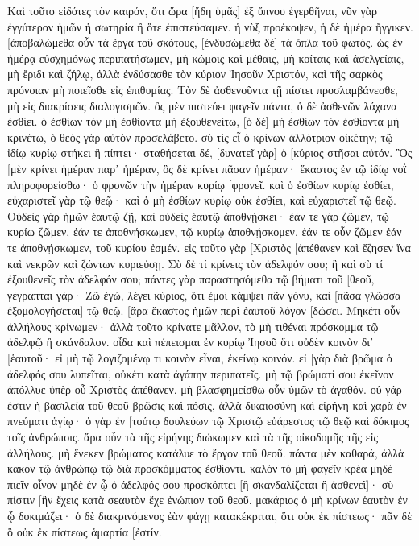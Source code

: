 Καὶ τοῦτο εἰδότες τὸν καιρόν, ὅτι ὥρα [ἤδη ὑμᾶς] ἐξ ὕπνου ἐγερθῆναι, νῦν γὰρ ἐγγύτερον ἡμῶν ἡ σωτηρία ἢ ὅτε ἐπιστεύσαμεν. 
ἡ νὺξ προέκοψεν, ἡ δὲ ἡμέρα ἤγγικεν. [ἀποβαλώμεθα οὖν τὰ ἔργα τοῦ σκότους, [ἐνδυσώμεθα δὲ] τὰ ὅπλα τοῦ φωτός. 
ὡς ἐν ἡμέρᾳ εὐσχημόνως περιπατήσωμεν, μὴ κώμοις καὶ μέθαις, μὴ κοίταις καὶ ἀσελγείαις, μὴ ἔριδι καὶ ζήλῳ, 
ἀλλὰ ἐνδύσασθε τὸν κύριον Ἰησοῦν Χριστόν, καὶ τῆς σαρκὸς πρόνοιαν μὴ ποιεῖσθε εἰς ἐπιθυμίας. 
Τὸν δὲ ἀσθενοῦντα τῇ πίστει προσλαμβάνεσθε, μὴ εἰς διακρίσεις διαλογισμῶν. 
ὃς μὲν πιστεύει φαγεῖν πάντα, ὁ δὲ ἀσθενῶν λάχανα ἐσθίει. 
ὁ ἐσθίων τὸν μὴ ἐσθίοντα μὴ ἐξουθενείτω, [ὁ δὲ] μὴ ἐσθίων τὸν ἐσθίοντα μὴ κρινέτω, ὁ θεὸς γὰρ αὐτὸν προσελάβετο. 
σὺ τίς εἶ ὁ κρίνων ἀλλότριον οἰκέτην; τῷ ἰδίῳ κυρίῳ στήκει ἢ πίπτει· σταθήσεται δέ, [δυνατεῖ γὰρ] ὁ [κύριος στῆσαι αὐτόν. 
Ὃς [μὲν κρίνει ἡμέραν παρ᾽ ἡμέραν, ὃς δὲ κρίνει πᾶσαν ἡμέραν· ἕκαστος ἐν τῷ ἰδίῳ νοῒ πληροφορείσθω· 
ὁ φρονῶν τὴν ἡμέραν κυρίῳ [φρονεῖ. καὶ ὁ ἐσθίων κυρίῳ ἐσθίει, εὐχαριστεῖ γὰρ τῷ θεῷ· καὶ ὁ μὴ ἐσθίων κυρίῳ οὐκ ἐσθίει, καὶ εὐχαριστεῖ τῷ θεῷ. 
Οὐδεὶς γὰρ ἡμῶν ἑαυτῷ ζῇ, καὶ οὐδεὶς ἑαυτῷ ἀποθνῄσκει· 
ἐάν τε γὰρ ζῶμεν, τῷ κυρίῳ ζῶμεν, ἐάν τε ἀποθνῄσκωμεν, τῷ κυρίῳ ἀποθνῄσκομεν. ἐάν τε οὖν ζῶμεν ἐάν τε ἀποθνῄσκωμεν, τοῦ κυρίου ἐσμέν. 
εἰς τοῦτο γὰρ [Χριστὸς [ἀπέθανεν καὶ ἔζησεν ἵνα καὶ νεκρῶν καὶ ζώντων κυριεύσῃ. 
Σὺ δὲ τί κρίνεις τὸν ἀδελφόν σου; ἢ καὶ σὺ τί ἐξουθενεῖς τὸν ἀδελφόν σου; πάντες γὰρ παραστησόμεθα τῷ βήματι τοῦ [θεοῦ, 
γέγραπται γάρ· Ζῶ ἐγώ, λέγει κύριος, ὅτι ἐμοὶ κάμψει πᾶν γόνυ, καὶ [πᾶσα γλῶσσα ἐξομολογήσεται] τῷ θεῷ. 
[ἄρα ἕκαστος ἡμῶν περὶ ἑαυτοῦ λόγον [δώσει. 
Μηκέτι οὖν ἀλλήλους κρίνωμεν· ἀλλὰ τοῦτο κρίνατε μᾶλλον, τὸ μὴ τιθέναι πρόσκομμα τῷ ἀδελφῷ ἢ σκάνδαλον. 
οἶδα καὶ πέπεισμαι ἐν κυρίῳ Ἰησοῦ ὅτι οὐδὲν κοινὸν δι᾽ [ἑαυτοῦ· εἰ μὴ τῷ λογιζομένῳ τι κοινὸν εἶναι, ἐκείνῳ κοινόν. 
εἰ [γὰρ διὰ βρῶμα ὁ ἀδελφός σου λυπεῖται, οὐκέτι κατὰ ἀγάπην περιπατεῖς. μὴ τῷ βρώματί σου ἐκεῖνον ἀπόλλυε ὑπὲρ οὗ Χριστὸς ἀπέθανεν. 
μὴ βλασφημείσθω οὖν ὑμῶν τὸ ἀγαθόν. 
οὐ γάρ ἐστιν ἡ βασιλεία τοῦ θεοῦ βρῶσις καὶ πόσις, ἀλλὰ δικαιοσύνη καὶ εἰρήνη καὶ χαρὰ ἐν πνεύματι ἁγίῳ· 
ὁ γὰρ ἐν [τούτῳ δουλεύων τῷ Χριστῷ εὐάρεστος τῷ θεῷ καὶ δόκιμος τοῖς ἀνθρώποις. 
ἄρα οὖν τὰ τῆς εἰρήνης διώκωμεν καὶ τὰ τῆς οἰκοδομῆς τῆς εἰς ἀλλήλους. 
μὴ ἕνεκεν βρώματος κατάλυε τὸ ἔργον τοῦ θεοῦ. πάντα μὲν καθαρά, ἀλλὰ κακὸν τῷ ἀνθρώπῳ τῷ διὰ προσκόμματος ἐσθίοντι. 
καλὸν τὸ μὴ φαγεῖν κρέα μηδὲ πιεῖν οἶνον μηδὲ ἐν ᾧ ὁ ἀδελφός σου προσκόπτει [ἢ σκανδαλίζεται ἢ ἀσθενεῖ]· 
σὺ πίστιν [ἣν ἔχεις κατὰ σεαυτὸν ἔχε ἐνώπιον τοῦ θεοῦ. μακάριος ὁ μὴ κρίνων ἑαυτὸν ἐν ᾧ δοκιμάζει· 
ὁ δὲ διακρινόμενος ἐὰν φάγῃ κατακέκριται, ὅτι οὐκ ἐκ πίστεως· πᾶν δὲ ὃ οὐκ ἐκ πίστεως ἁμαρτία [ἐστίν. 
